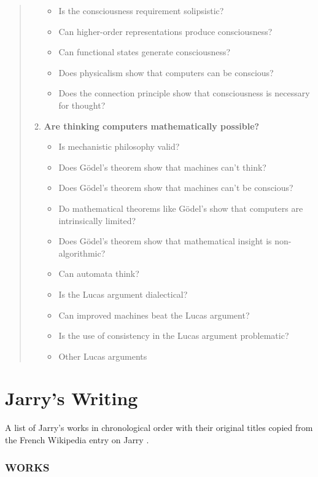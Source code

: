 \begin{quotation}
\begin{enumerate}
\begin{itemize}
        \item Is the consciousness requirement solipsistic?
        \item Can higher-order representations produce consciousness?
        \item Can functional states generate consciousness?
        \item Does physicalism show that computers can be conscious?
        \item Does the connection principle show that consciousness is necessary for thought?
      \end{itemize}
    \item \textbf{Are thinking computers mathematically possible?}
      \begin{itemize}
        \item Is mechanistic philosophy valid?
        \item Does G{\"o}del's theorem show that machines can't think?
        \item Does G{\"o}del's theorem show that machines can't be conscious?
        \item Do mathematical theorems like G{\"o}del's show that computers are intrinsically limited?
        \item Does G{\"o}del's theorem show that mathematical insight is non-algorithmic?
        \item Can automata think?
        \item Is the Lucas argument dialectical?
        \item Can improved machines beat the Lucas argument?
        \item Is the use of consistency in the Lucas argument problematic?
        \item Other Lucas arguments
      \end{itemize}
  \end{enumerate}
\end{quotation}


\section{Jarry's Writing}
\label{s:jarry}

A list of Jarry's works in chronological order with their original titles copied from the French Wikipedia entry on Jarry \citeyear{WikiJarry2016}.

\subsubsection{WORKS}


